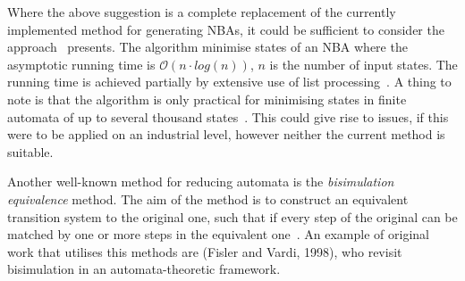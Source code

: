 Where the above suggestion is a complete replacement of the currently implemented method for generating NBAs, it could be sufficient to consider the approach~\cite{hopcroft1971n} presents. The algorithm minimise states of an NBA where the asymptotic running time is $\mathcal{O}(n \cdot log(n))$, $n$ is the number of input states. The running time is achieved partially by extensive use of list processing~\cite{hopcroft1971n}. A thing to note is that the algorithm is only practical for minimising states in finite automata of up to several thousand states~\cite{hopcroft1971n}. This could give rise to issues, if this were to be applied on an industrial level, however neither the current method is suitable.

Another well-known method for reducing automata is the \emph{bisimulation equivalence} method. The aim of the method is to construct an equivalent transition system to the original one, such that if every step of the original can be matched by one or more steps in the equivalent one~\cite{baier2008principles}. An example of original work that utilises this methods are (Fisler and Vardi, 1998)\cite{fisler1998a}, who revisit bisimulation in an automata-theoretic framework.

